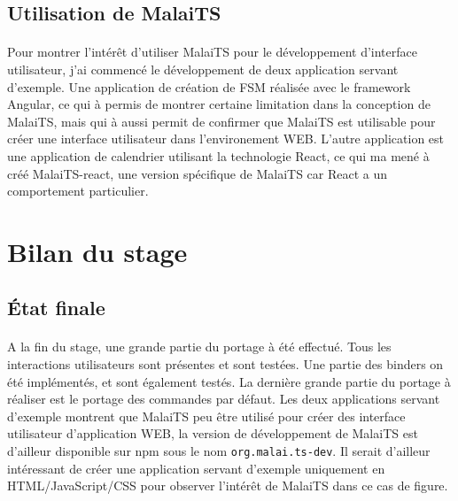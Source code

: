 \documentclass[11pt, a4paper, pdftex]{article}
\newcommand{\info}{\texttt}
\begin{document}
        \subsection{Utilisation de MalaiTS}\label{subsec:travexem}
            \paragraph{}
                Pour montrer l'intérêt d'utiliser MalaiTS pour le développement d'interface utilisateur, j'ai commencé le développement de deux application servant d'exemple.
                Une application de création de FSM réalisée avec le framework Angular, ce qui à permis de montrer certaine limitation dans la conception de MalaiTS,
                mais qui à aussi permit de confirmer que MalaiTS est utilisable pour créer une interface utilisateur dans l'environement WEB\@.
                L'autre application est une application de calendrier utilisant la technologie React, ce qui ma mené à créé MalaiTS-react, une version spécifique de MalaiTS car React a un comportement particulier.

    \newpage
    \section{Bilan du stage}\label{sec:bilsta}
        \subsection{État finale}\label{subsec:etatfin}
            \paragraph{}
                A la fin du stage, une grande partie du portage à été effectué.
                Tous les interactions utilisateurs sont présentes et sont testées.
                Une partie des binders on été implémentés, et sont également testés.
                La dernière grande partie du portage à réaliser est le portage des commandes par défaut.
                Les deux applications servant d'exemple montrent que MalaiTS peu être utilisé pour créer des interface utilisateur d'application WEB, la version de développement de MalaiTS est d'ailleur disponible sur npm sous le nom \info{org.malai.ts-dev}.
                Il serait d'ailleur intéressant de créer une application servant d'exemple uniquement en HTML/JavaScript/CSS pour observer l'intérêt de MalaiTS dans ce cas de figure.
\end{document}
